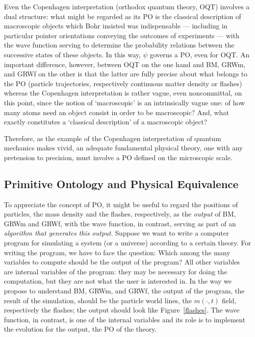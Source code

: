 \documentclass[12pt]{article}
\begin{document}
Even the Copenhagen interpretation (orthodox quantum theory, {\sf OQT}) involves a dual structure: what might be regarded as its \textrm{PO} is the
classical description of macroscopic objects which Bohr insisted was
indispensable --- including in particular pointer orientations conveying the outcomes of experiments --- with the wave function serving to determine the
probability relations between the successive states of these objects. In this way, $\psi$ governs a \textrm{PO}, even for {\sf OQT}. An
important difference, however, between {\sf OQT} on the one hand
and {\sf BM}, {\sf GRWm}, and {\sf GRWf} on the other is that the latter
are fully precise about what belongs to the \textrm{PO} (particle trajectories,
respectively continuous matter density or  flashes) whereas
the Copenhagen interpretation is rather vague, even noncommittal, on this point, since the notion of `macroscopic' is an intrinsically vague one: of how many atoms need an
object consist in order to be macroscopic? And, what exactly
constitutes a `classical description' of a macroscopic object?

Therefore, as the example of the Copenhagen interpretation of quantum mechanics makes vivid, an adequate fundamental 
physical theory, one with any pretension to precision, must involve a PO defined on the microscopic scale. 

\subsection{Primitive Ontology and Physical Equivalence}
\label{sec:morePO}

To appreciate the concept of PO, it might be useful to regard the positions of particles, the mass density and the flashes, respectively, as the \emph{output} of {\sf BM}, {\sf GRWm} and {\sf GRWf}, with the wave function, in contrast, serving as part of an \emph{algorithm that generates this output}.
Suppose we want to write a computer program for simulating a system (or a universe) according to a certain theory. For
writing the program, we have to face the question: Which among the many
variables to compute should be the output of the program? 
All other variables are internal variables of the program: they may be necessary for doing the computation,
but they are not what the user is interested in. In the way we propose to understand {\sf BM}, {\sf GRWm}, and {\sf GRWf}, the output of the program, the result of the simulation, should be the particle world lines, the $m(\cdot,t)$ field, respectively the flashes; the output should look like Figure~\ref{flashes}. The wave function, in contrast, is one of the internal variables and its role is to implement the evolution for the output, the PO of the theory.
\end{document}
